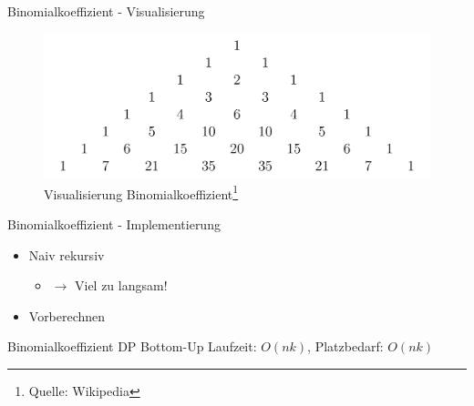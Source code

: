 \documentclass[18pt]{beamer}
\begin{document}
\begin{frame}{Binomialkoeffizient - Visualisierung}
\begin{figure}
  \caption{Visualisierung Binomialkoeffizient\footnote{Quelle: Wikipedia}}
  \centering
	\includegraphics[scale=0.15]{binom.png}
\end{figure}
\end{frame}

\begin{frame}{Binomialkoeffizient - Implementierung}
\begin{itemize}
\item Naiv rekursiv
\begin{itemize}
\item $\rightarrow$ Viel zu langsam!
\end{itemize}
\item Vorberechnen
\end{itemize}
\end{frame}

\begin{frame} {Binomialkoeffizient DP Bottom-Up}
Laufzeit: $O \left( nk \right)$, Platzbedarf: $O \left( nk \right)$
\end{frame}
\end{document}
